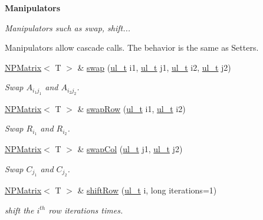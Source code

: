 \begin{Indent}\textbf{ Manipulators}\par
{\em Manipulators such as swap, shift...

Manipulators allow cascade calls. The behavior is the same as Setters. }\begin{DoxyCompactItemize}
\item 
\mbox{\hyperlink{class_n_p_matrix}{N\+P\+Matrix}}$<$ T $>$ \& \mbox{\hyperlink{class_n_p_matrix_a599031f0b0fd352a047f1e87c16e17c6}{swap}} (\mbox{\hyperlink{group___n_algebra_ga1b140a2034db3f5dfe18a987745df43a}{ul\+\_\+t}} i1, \mbox{\hyperlink{group___n_algebra_ga1b140a2034db3f5dfe18a987745df43a}{ul\+\_\+t}} j1, \mbox{\hyperlink{group___n_algebra_ga1b140a2034db3f5dfe18a987745df43a}{ul\+\_\+t}} i2, \mbox{\hyperlink{group___n_algebra_ga1b140a2034db3f5dfe18a987745df43a}{ul\+\_\+t}} j2)
\begin{DoxyCompactList}\small\item\em Swap $ A_{i_1j_1} $ and $ A_{i_2j_2} $. \end{DoxyCompactList}\item 
\mbox{\hyperlink{class_n_p_matrix}{N\+P\+Matrix}}$<$ T $>$ \& \mbox{\hyperlink{class_n_p_matrix_a85b764f2c21bce5c913c5e0aabb026a1}{swap\+Row}} (\mbox{\hyperlink{group___n_algebra_ga1b140a2034db3f5dfe18a987745df43a}{ul\+\_\+t}} i1, \mbox{\hyperlink{group___n_algebra_ga1b140a2034db3f5dfe18a987745df43a}{ul\+\_\+t}} i2)
\begin{DoxyCompactList}\small\item\em Swap $ R_{i_1} $ and $ R_{i_2} $. \end{DoxyCompactList}\item 
\mbox{\hyperlink{class_n_p_matrix}{N\+P\+Matrix}}$<$ T $>$ \& \mbox{\hyperlink{class_n_p_matrix_a0df10f5717511bc15429955244b83ea1}{swap\+Col}} (\mbox{\hyperlink{group___n_algebra_ga1b140a2034db3f5dfe18a987745df43a}{ul\+\_\+t}} j1, \mbox{\hyperlink{group___n_algebra_ga1b140a2034db3f5dfe18a987745df43a}{ul\+\_\+t}} j2)
\begin{DoxyCompactList}\small\item\em Swap $ C_{j_1} $ and $ C_{j_2} $. \end{DoxyCompactList}\item 
\mbox{\hyperlink{class_n_p_matrix}{N\+P\+Matrix}}$<$ T $>$ \& \mbox{\hyperlink{class_n_p_matrix_a8927e2dc64af30c6f619a93678332093}{shift\+Row}} (\mbox{\hyperlink{group___n_algebra_ga1b140a2034db3f5dfe18a987745df43a}{ul\+\_\+t}} i, long iterations=1)
\begin{DoxyCompactList}\small\item\em shift the $ i^{th} $ row {\ttfamily iterations} times. \end{DoxyCompactList}\item 

\end{DoxyCompactItemize}
\end{Indent}
